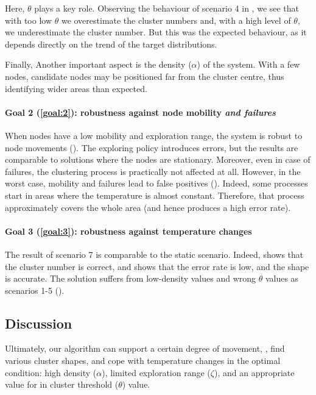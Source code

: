 Here, $\theta$ plays a key role. Observing the behaviour of scenario 4 in ,
 we see that with too low $\theta$ we overestimate the cluster numbers and,
 with a high level of $\theta$, we underestimate the cluster number.
 But this was the expected behaviour, as it depends directly on the trend of the target distributions.

Finally, Another important aspect is the density ($\alpha$) of the system.
 With a few nodes, candidate nodes may be positioned far from the cluster centre, thus identifying wider areas than expected.
\paragraph{Goal 2 (\ref{goal:2}): robustness against node mobility \emph{and failures}}
When nodes have a low mobility and exploration range, the system is robust to node movements ().
 The exploring policy introduces errors, but the results are comparable to solutions where the nodes are stationary.
Moreover, even in case of failures, the clustering process is practically not affected at all.
However, in the worst case, mobility and failures lead to false positives ().
 Indeed, some processes start in areas where the temperature is almost constant.
 Therefore, that process approximately covers the whole area (and hence produces a high error rate).
\paragraph{Goal 3 (\ref{goal:3}): robustness against temperature changes}
The result of scenario 7 is comparable to the static scenario.
 Indeed,  shows that the cluster number is correct, and  shows that the error rate is low, and the shape is accurate.
 The solution suffers from low-density values and wrong $\theta$ values as scenarios 1-5 ().

\subsection{Discussion}
\label{sec:eval-discussion}

Ultimately, our algorithm can support a certain degree of movement, ,
 find various cluster shapes, and cope with temperature changes in the optimal condition:
 high density ($\alpha$), limited exploration range ($\zeta$), and an appropriate value for in cluster threshold ($\theta$) value.

